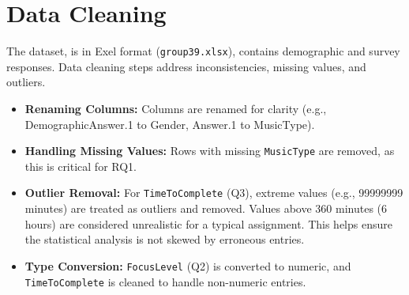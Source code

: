 \documentclass[
]{article}
\providecommand{\tightlist}{%
  \setlength{\itemsep}{0pt}\setlength{\parskip}{0pt}}
\begin{document}
\section{Data Cleaning}\label{data-cleaning}

The dataset, is in Exel format (\texttt{group39.xlsx}), contains
demographic and survey responses. Data cleaning steps address
inconsistencies, missing values, and outliers.

\begin{itemize}
\tightlist
\item
  \textbf{Renaming Columns:} Columns are renamed for clarity (e.g.,
  DemographicAnswer.1 to Gender, Answer.1 to MusicType).
\item
  \textbf{Handling Missing Values:} Rows with missing \texttt{MusicType}
  are removed, as this is critical for RQ1.
\item
  \textbf{Outlier Removal:} For \texttt{TimeToComplete} (Q3), extreme
  values (e.g., 99999999 minutes) are treated as outliers and removed.
  Values above 360 minutes (6 hours) are considered unrealistic for a
  typical assignment. This helps ensure the statistical analysis is not
  skewed by erroneous entries.
\item
  \textbf{Type Conversion:} \texttt{FocusLevel} (Q2) is converted to
  numeric, and \texttt{TimeToComplete} is cleaned to handle non-numeric
  entries.
\end{itemize}
\end{document}
